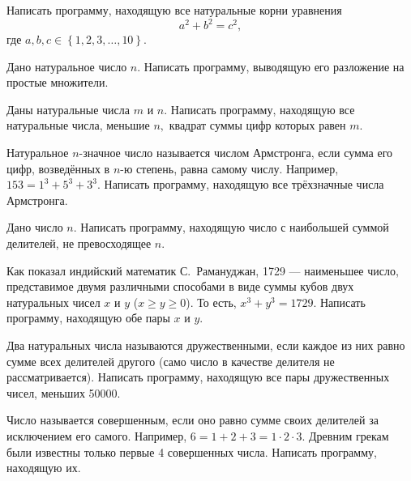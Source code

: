 \task Написать программу, находящую все натуральные корни уравнения
\[
a^2+b^2=c^2,
\]
где $a, b, c \in \left\{1, 2, 3, \ldots, 10\right\}.$

\task Дано натуральное число $n$. Написать программу, выводящую его
разложение на простые множители.

\task Даны натуральные числа $m$ и $n$. Написать программу, находящую
все натуральные числа, меньшие $n,$ квадрат суммы цифр которых равен
$m$.

\task Натуральное $n$-значное число называется числом Армстронга, если
сумма его цифр, возведённых в $n$-ю степень, равна самому
числу. Например, $153 = 1^3 + 5^3 + 3^3$. Написать программу,
находящую все трёхзначные числа Армстронга.

\task Дано число $n$. Написать программу, находящую число с наибольшей
суммой делителей, не превосходящее $n$.

\task Как показал индийский математик С.~Рамануджан, 1729 — наименьшее
число, представимое двумя различными способами в виде суммы кубов двух
натуральных чисел $x$ и $y$ ($x\geqslant y\geqslant 0$).  То есть,
$x^3+y^3=1729$. Написать программу, находящую обе пары $x$ и $y$.

\task Два натуральных числа называются дружественными, если каждое из
них равно сумме всех делителей другого (само число в качестве делителя
не рассматривается). Написать программу, находящую все пары
дружественных чисел, меньших 50000.

\task Число называется совершенным, если оно равно сумме своих
делителей за исключением его самого. Например, $6=1+2+3=1\cdot
2\cdot3$. Древним грекам были известны только первые 4 совершенных
числа. Написать программу, находящую их.
